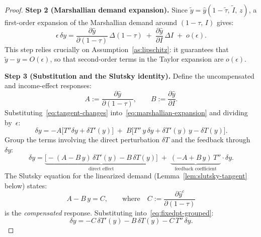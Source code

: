 \documentclass[12pt,a4paper]{article}
\theoremstyle{definition}
\theoremstyle{plain}
\theoremstyle{remark}
\begin{document}
\begin{proof}
\medskip
\noindent\textbf{Step 2 (Marshallian demand expansion).}
Since $\tilde y = \hat y(1-\tilde\tau,\,\tilde I,\,z)$, a first-order expansion of the Marshallian demand around $(1-\tau,\,I)$ gives:
\begin{equation}
\label{eq:marshallian-expansion}
  \epsilon\,\delta y
  = \frac{\partial\hat y}{\partial(1-\tau)}\,\Delta(1-\tau)
  \;+\;
  \frac{\partial\hat y}{\partial I}\,\Delta I
  \;+\; o(\epsilon).
\end{equation}
This step relies crucially on Assumption~\ref{as:lipschitz}: it guarantees that $\tilde y - y = O(\epsilon)$, so that second-order terms in the Taylor expansion are $o(\epsilon)$.

\medskip
\noindent\textbf{Step 3 (Substitution and the Slutsky identity).}
Define the uncompensated and income-effect responses:
\[
  A := \frac{\partial\hat y}{\partial(1-\tau)}, \qquad B := \frac{\partial\hat y}{\partial I}.
\]
Substituting~\eqref{eq:tangent-changes} into~\eqref{eq:marshallian-expansion} and dividing by~$\epsilon$:
\begin{equation}
\label{eq:fixedpt-raw}
  \delta y
  = -A\bigl[T''\delta y + \delta T'(y)\bigr]
  \;+\; B\bigl[T''\,y\,\delta y + \delta T'(y)\,y - \delta T(y)\bigr].
\end{equation}
Group the terms involving the direct perturbation $\delta T$ and the feedback through $\delta y$:
\begin{equation}
\label{eq:fixedpt-grouped}
  \delta y
  = \underbrace{\bigl[-(A - B\,y)\,\delta T'(y) - B\,\delta T(y)\bigr]}_{\text{direct effect}}
  \;+\; \underbrace{(-A + B\,y)\,T''}_{\text{feedback coefficient}} \cdot\delta y.
\end{equation}
The Slutsky equation for the linearized demand (Lemma~\ref{lem:slutsky-tangent} below) states:
\begin{equation}
\label{eq:slutsky-tangent}
  A - B\,y = C, \qquad\text{where}\quad C := \frac{\partial\hat y^c}{\partial(1-\tau)}
\end{equation}
is the \emph{compensated} response.  Substituting into~\eqref{eq:fixedpt-grouped}:
\begin{equation}
\label{eq:fixedpt-slutsky}
  \delta y = -C\,\delta T'(y) - B\,\delta T(y) - C\,T''\,\delta y.
\end{equation}


\end{proof}
\end{document}
